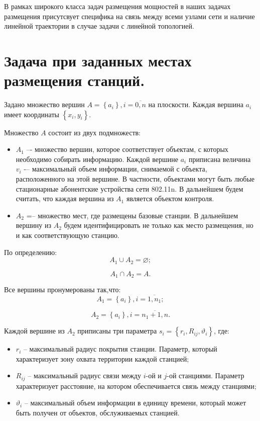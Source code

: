 В рамках широкого класса задач размещения мощностей в наших задачах размещения присутсвует специфика на связь между всеми узлами сети и наличие линейной траектории в случае задачи с линейной топологией.


\section{Задача при заданных местах размещения станций.}

Задано множество вершин $A= \left\{ a_i \right\}, i=\overline{0,n}$ на плоскости. Каждая вершина $a_i$ имеет координаты $\left\{ x_i, y_i \right\}$.

Множество $A$ состоит из двух подмножеств:
\begin{itemize}
    \item $A_1$ –- множество вершин, которое соответствует объектам, с которых необходимо собирать информацию. Каждой вершине $a_i$ приписана величина $v_i$ -– максимальный объем информации, снимаемой с объекта, расположенного на этой вершине. В частности, объектами могут быть любые стационарные абонентские устройства сети 802.11n. В дальнейшем будем считать, что каждая вершина из $A_1$ является объектом контроля.
    \item $A_2$ =– множество мест, где размещены базовые станции. В дальнейшем вершину из $A_2$ будем идентифицировать  не только как место размещения, но и как соответствующую станцию.
\end{itemize}

По определению:
$$
A_1 \cup A_2 = \varnothing;
$$

$$
A_1 \cap A_2 = A.
$$

Все вершины пронумерованы так,что:
$$
A_1 = \left\{a_i \right\}, i= \overline{1,n_1};
$$

$$
A_2 = \left\{ a_i  \right\}, i= \overline{n_1+1,n}.
$$

Каждой вершине из $A_2$ приписаны три параметра $s_i = \left\{ r_i, R_{ij},\vartheta_i \right\} $, где:

\begin{itemize}
    \item $r_i$ -- максимальный радиус покрытия станции. Параметр, который характеризует зону охвата территории каждой станцией;
    \item $R_{ij}$ -- максимальный радиус связи между $i$-ой и $j$-ой станциями. Параметр характеризует расстояние, на котором обеспечивается связь между станциями;
    \item $\vartheta_i$ -- максимальный объем информации в единицу времени, который может быть получен от объектов, обслуживаемых станцией.
\end{itemize}

